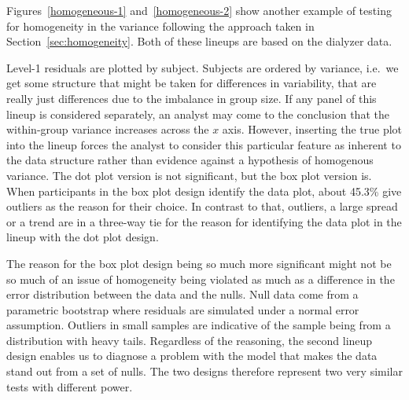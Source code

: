 \documentclass[12pt]{article} %
\newcommand{\alnote}[1]{\todo[inline,color=green!40]{#1}} %
\begin{document}

Figures~\ref{homogeneous-1} and~\ref{homogeneous-2} show another example of testing for homogeneity in the variance following the approach taken in Section~\ref{sec:homogeneity}. Both of these lineups are based on the dialyzer data. 

Level-1 residuals are plotted by subject. Subjects are ordered by variance, i.e.~we get some structure that might be taken for differences in variability, that are really just differences due to the imbalance in group size. If any panel of this lineup is considered separately, an analyst may come to the conclusion that the within-group variance increases across the $x$ axis.  However, inserting the true plot into the lineup forces the analyst to consider this particular feature as inherent to the data structure rather than evidence against a hypothesis of homogenous variance. 
The dot plot version is not significant, but the box plot version is. When participants in the box plot design identify the data plot, about 45.3\% give outliers as the reason for their choice. In contrast to that, outliers, a large spread or a trend are in a three-way tie for the reason for identifying the data plot in the lineup with the dot plot design.

The reason for the box plot design being so much more significant might not be so much of an issue of homogeneity being violated as much as a difference in the error distribution between the data and the nulls. Null data come from a parametric bootstrap where residuals are simulated under a normal error assumption. Outliers in small samples are indicative of the sample being from a distribution with heavy tails.
Regardless of the reasoning, the second lineup design enables us to diagnose a problem with the model that makes the data stand out from a set of nulls.  The two designs therefore represent two very similar tests with different power.


\end{document}
